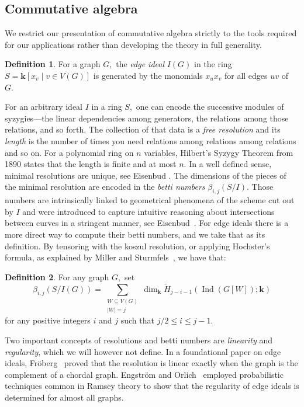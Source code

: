 \documentclass{article}
\theoremstyle{plain}
\theoremstyle{definition}
\newtheorem{defn}{Definition}
\begin{document}
\subsection{Commutative algebra}
We restrict our presentation of commutative algebra strictly to the tools required for our applications rather than developing the theory in full generality.
\begin{defn}\label{defn:edgeideal}
For a graph $G,$ the \emph{edge ideal} $I(G)$ in the ring $S=\mathbf{k}[x_v \mid v \in V(G) ]$ is generated by the monomials $x_ux_v$ for all edges $uv$ of $G.$
\end{defn}
For an arbitrary ideal $I$ in a ring $S,$ one can encode the successive modules of syzygies—the linear dependencies among generators, the relations among those relations, and so forth. The collection of that data is a \emph{free resolution} and its \emph{length} is the number of times you need relations among relations among relations and so on. For a polynomial ring on $n$ variables, Hilbert's Syzygy Theorem from 1890 states that the length is finite and at most $n$. In a well defined sense, minimal resolutions are unique, see Eisenbud \cite{eisenbud1995}. The dimensions of the pieces of the minimal resolution are encoded in the \emph{betti numbers} $\beta_{i,j}(S/I).$ Those numbers are intrinsically linked to geometrical phenomena of the scheme cut out by $I$ and were introduced to capture intuitive reasoning about intersections between curves in a stringent manner, see Eisenbud~\cite{eisenbud2005}. For edge ideals there is a more direct way to compute their betti numbers, and we take that as its definition. By tensoring with the koszul resolution, or applying Hochster's formula, as explained by Miller and Sturmfels~\cite{miller2005}, we have that:
\begin{defn}\label{defn:betti} For any graph $G,$ set
\[
\beta_{i,j}(S/I(G)) = \sum_{\substack{W \subseteq V(G) \\ |W| = j}} \dim_{\mathbf{k}} \widetilde{H}_{j - i - 1}(\operatorname{Ind}(G[W]); \mathbf{k})
\]
for any positive integers $i$ and $j$ such that $j/2 \leq i \leq j-1.$ 
\end{defn}
Two important concepts of resolutions and betti numbers are  \emph{linearity} and \emph{regularity}, which we will however not define. In a foundational paper on edge ideals, Fr\"oberg~\cite{froberg1990} proved that the resolution is linear exactly when the graph is the complement of a chordal graph. Engstr\"om and Orlich~\cite{engstrom2023} employed probabilistic techniques common in Ramsey theory to show that the regularity of edge ideals is determined for almost all graphs.
\end{document}
